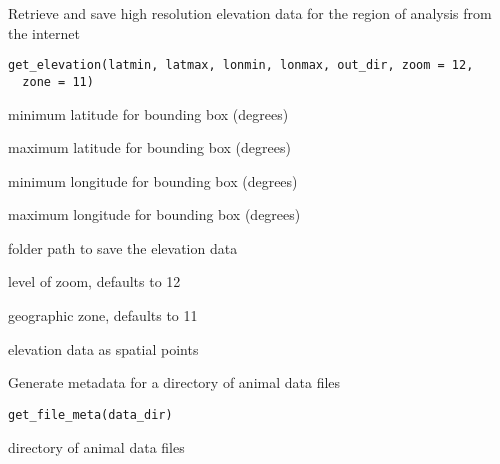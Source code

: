 \documentclass[a4paper]{book}
\begin{document}
%
\begin{Description}\relax
Retrieve and save high resolution elevation data for the region of analysis from the internet
\end{Description}
%
\begin{Usage}
\begin{verbatim}
get_elevation(latmin, latmax, lonmin, lonmax, out_dir, zoom = 12,
  zone = 11)
\end{verbatim}
\end{Usage}
%
\begin{Arguments}
\begin{ldescription}
\item[\code{latmin}] minimum latitude for bounding box (degrees)

\item[\code{latmax}] maximum latitude for bounding box (degrees)

\item[\code{lonmin}] minimum longitude for bounding box (degrees)

\item[\code{lonmax}] maximum longitude for bounding box (degrees)

\item[\code{out\_dir}] folder path to save the elevation data

\item[\code{zoom}] level of zoom, defaults to 12

\item[\code{zone}] geographic zone, defaults to 11
\end{ldescription}
\end{Arguments}
%
\begin{Value}
elevation data as spatial points
\end{Value}
%
\begin{Description}\relax
Generate metadata for a directory of animal data files
\end{Description}
%
\begin{Usage}
\begin{verbatim}
get_file_meta(data_dir)
\end{verbatim}
\end{Usage}
%
\begin{Arguments}
\begin{ldescription}
\item[\code{data\_dir}] directory of animal data files
\end{ldescription}
\end{Arguments}
\end{document}
